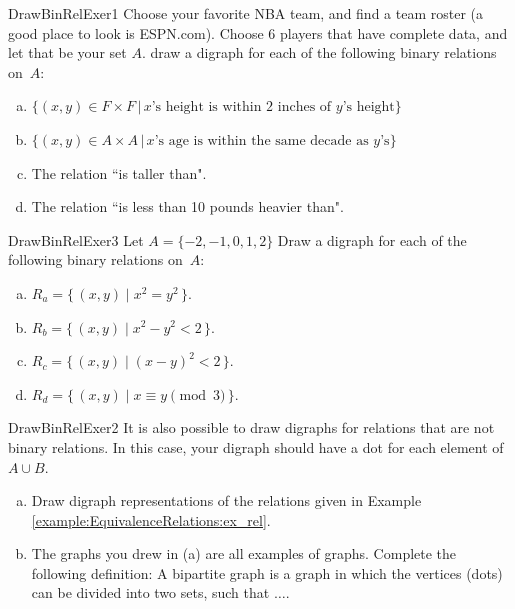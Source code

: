  \begin{exercise}{DrawBinRelExer1}
Choose your favorite NBA team, and find a team roster (a good place to look is ESPN.com). Choose 6 players that have complete data, and let that be your set $A$.  draw a digraph for each of the following binary relations on~$A$: 
 \begin{enumerate}[(a)]
 \item \label{DrawBinRelExer-sister}
 $\{ (x,y) \in F \times F \,|\, x  \text{'s height is within 2 inches of }y\text{'s height} \}$
 \item \label{DrawBinRelExer-son}
 $\{ (x,y) \in A \times A \,|\, x\text{'s age is within the same decade as }y\text{'s}  \}$ 
 \item \label{DrawBinRelExer-married}
 The relation ``is taller than".
  \item \label{DrawBinRelExer-lived}
 The relation ``is less than 10 pounds heavier than".
 \end{enumerate}
 \end{exercise}
 
 \begin{exercise}{DrawBinRelExer3}
Let $A =  \{-2,-1,0,1,2\}$ Draw a digraph for each of the following binary relations on~$A$: 

 \begin{enumerate}[(a)]
 \item \label{DrawBinRelExer-son}
 $R_a = \{\, (x,y) \mid  x^2 = y^2 \,\} .$
 \item \label{DrawBinRelExer-sister}
$ R_b = \{\, (x,y) \mid  x^2 - y^2 < 2 \,\} .$
 \item \label{DrawBinRelExer-married}
 $ R_c = \{\, (x,y) \mid  (x-y)^2 < 2 \,\} .$
  \item \label{DrawBinRelExer-lived}
$ R_d = \{\, (x,y) \mid  x\equiv y \pmod{3} \,\} .$
 \end{enumerate}
 \end{exercise}

 \begin{exercise}{DrawBinRelExer2}
It is also possible to draw digraphs for relations that are not binary relations. In this case, your digraph should have a dot for each element of $A \cup B$.
 \begin{enumerate}[(a)]
 \item \label{DrawBinRelExer-son}
Draw digraph representations of the relations given in Example \ref{example:EquivalenceRelations:ex_rel}.
 \item \label{DrawBinRelExer-sister}
The graphs you drew in (a) are all examples of  graphs.  Complete the following definition:  A bipartite graph is a graph in which the vertices (dots) can be divided into two  sets, such that $\ldots$.
 \end{enumerate}
 \end{exercise}


